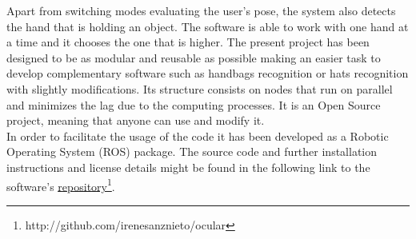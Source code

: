


Apart from switching modes evaluating the user's pose, the system also detects the hand that is holding an object. 
The software is able to work with one hand at a time and it chooses the one that is higher. 
The present project has been designed to be as modular and reusable as possible making an easier task to develop complementary software such as handbags recognition or hats recognition with slightly modifications. Its structure consists on nodes that run on parallel and minimizes the lag due to the computing processes. It is an Open Source project, meaning that anyone can use and modify it.
\\

In order to facilitate the usage of the code it has been developed as a Robotic Operating System (ROS) \cite{ros} package. The source code and further installation instructions and license details might be found in the following link to the software's \href{http://github.com/irenesanznieto/ocular}{\color{blue}\underline {repository}}\footnote{http://github.com/irenesanznieto/ocular}. 
